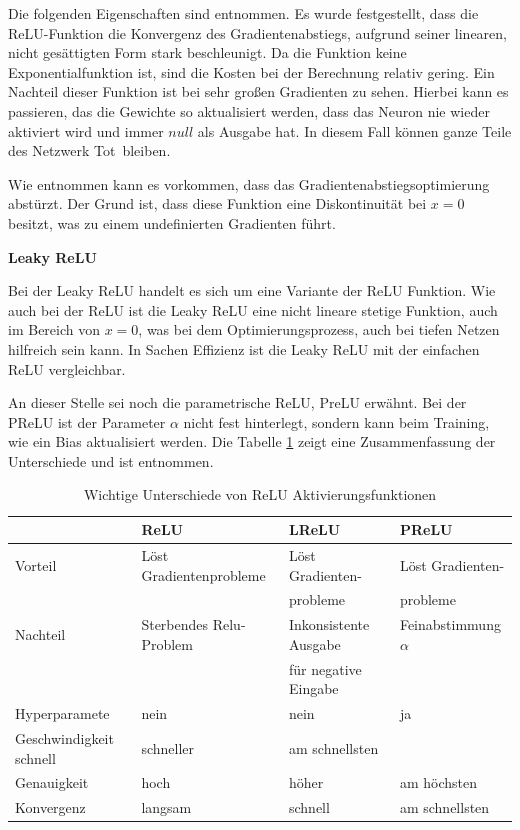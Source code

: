 Die folgenden Eigenschaften sind \cite{cs231n_2024} entnommen. Es wurde festgestellt, dass die ReLU-Funktion die Konvergenz des Gradientenabstiegs, aufgrund seiner linearen, nicht gesättigten Form stark beschleunigt. Da die Funktion keine Exponentialfunktion ist, sind die Kosten bei der Berechnung relativ gering. Ein Nachteil dieser Funktion ist bei sehr großen Gradienten zu sehen. Hierbei kann es passieren, das die Gewichte so aktualisiert werden, dass das Neuron nie wieder aktiviert wird und immer $null$ als Ausgabe hat. In diesem Fall können ganze Teile des Netzwerk \glqq Tot\grqq \ bleiben. 
\vspace{0.2cm}

Wie \cite{yuen_universal_2021} entnommen kann es vorkommen, dass das Gradientenabstiegsoptimierung abstürzt. Der Grund ist, dass diese Funktion eine Diskontinuität bei $x=0$ besitzt, was zu einem undefinierten Gradienten führt.\vspace{0.2cm} 

%
\textbf{Leaky ReLU}\vspace{0.2cm}

Bei der Leaky ReLU handelt es sich um eine Variante der ReLU Funktion. Wie auch bei der ReLU ist die Leaky ReLU eine nicht lineare stetige Funktion, auch im Bereich von $x = 0$, was bei dem Optimierungsprozess, auch bei tiefen Netzen hilfreich sein kann. In Sachen Effizienz ist die Leaky ReLU mit der einfachen ReLU vergleichbar.\vspace{0.2cm}

An dieser Stelle sei noch die parametrische ReLU, PreLU erwähnt. Bei der PReLU ist der Parameter $\alpha$ nicht fest hinterlegt, sondern kann beim Training, wie ein Bias aktualisiert werden. Die Tabelle \ref{tab:relu_types_differents} zeigt eine Zusammenfassung der Unterschiede und ist \cite{bhargav-2023} entnommen.

\begin{center}
	\begin{table}[!ht]
		\begin{tabular}{>{\small}l>{\small}l>{\small}l>{\small}l}
			& \textbf{ReLU} & \textbf{LReLU} & \textbf{PReLU} \\
			\hline
			Vorteil & Löst Gradientenprobleme & Löst Gradienten- & Löst Gradienten- \\
			&& probleme & probleme \\
			Nachteil & Sterbendes Relu-Problem & Inkonsistente Ausgabe & Feinabstimmung $\alpha$ \\
			&& für negative Eingabe & \\
			Hyperparamete & nein & nein & ja \\
			Geschwindigkeit schnell& schneller & am schnellsten & \\
			Genauigkeit & hoch& höher & am höchsten \\
			Konvergenz & langsam & schnell & am schnellsten \\
		\end{tabular}
		\caption{Wichtige Unterschiede von ReLU Aktivierungsfunktionen}
		\label{tab:relu_types_differents}
	\end{table}
\end{center}

